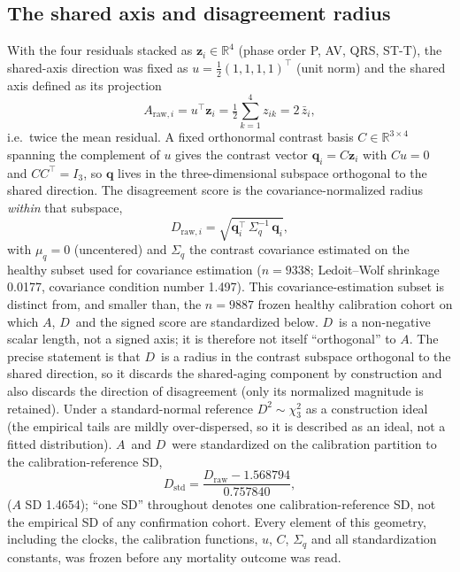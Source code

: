 \documentclass[11pt]{article}
\newcommand{\D}{\ensuremath{D}}
\newcommand{\A}{\ensuremath{A}}
\begin{document}
\subsection{The shared axis and disagreement radius}
With the four residuals stacked as $\mathbf{z}_i\in\mathbb{R}^4$ (phase order P, AV, QRS,
ST-T), the shared-axis direction was fixed as $u=\tfrac12(1,1,1,1)^{\top}$ (unit norm) and
the shared axis defined as its projection
\begin{equation}
\A_{\text{raw},i}=u^{\top}\mathbf{z}_i=\tfrac12\sum_{k=1}^{4}z_{ik}=2\,\bar z_i,
\end{equation}
i.e.\ twice the mean residual. A fixed orthonormal contrast basis
$C\in\mathbb{R}^{3\times4}$ spanning the complement of $u$ gives the contrast vector
$\mathbf{q}_i=C\mathbf{z}_i$ with $Cu=0$ and $CC^{\top}=I_3$, so $\mathbf{q}$ lives in the
three-dimensional subspace orthogonal to the shared direction. The disagreement score is
the covariance-normalized radius \emph{within} that subspace,
\begin{equation}
\D_{\text{raw},i}=\sqrt{\mathbf{q}_i^{\top}\,\Sigma_q^{-1}\,\mathbf{q}_i},
\end{equation}
with $\mu_q=0$ (uncentered) and $\Sigma_q$ the contrast covariance estimated on the
healthy subset used for covariance estimation ($n=\num{9338}$; Ledoit--Wolf shrinkage
\citep{ledoit2004} \num{0.0177}, covariance condition number \num{1.497}). This
covariance-estimation subset is distinct from, and smaller than, the $n=\num{9887}$ frozen
healthy calibration cohort on which \A, \D\ and the signed score are standardized below. \D\ is a non-negative scalar
length, not a signed axis; it is therefore not itself ``orthogonal'' to \A. The precise
statement is that \D\ is a radius in the contrast subspace orthogonal to the shared
direction, so it discards the shared-aging component by construction and also discards the
direction of disagreement (only its normalized magnitude is retained). Under a
standard-normal reference $\D^2\sim\chi^2_3$ as a construction ideal (the empirical tails
are mildly over-dispersed, so it is described as an ideal, not a fitted distribution). \A\
and \D\ were standardized on the calibration partition to the calibration-reference SD,
\begin{equation}
\D_{\text{std}}=\frac{\D_{\text{raw}}-1.568794}{0.757840},
\end{equation}
($\A$ SD \num{1.4654}); ``one SD'' throughout denotes one calibration-reference SD, not
the empirical SD of any confirmation cohort. Every element of this geometry, including the clocks,
the calibration functions, $u$, $C$, $\Sigma_q$ and all standardization
constants, was frozen before any mortality outcome was read.
\end{document}
